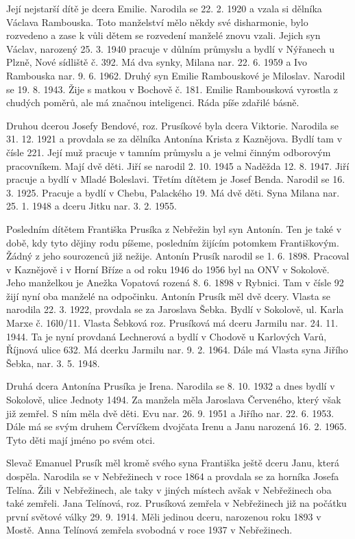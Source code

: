 \documentclass[../dejiny-rodu-prusiku.tex]{subfiles}
\begin{document}
Její nejstarší dítě je dcera Emilie. Narodila se 22.  2. 1920 a vzala si dělníka Václava Rambouska. Toto manžel­ství mělo někdy své disharmonie, bylo rozvedeno a za­se k vůli dětem se rozvedení manželé znovu vzali. Jejich syn Václav, narozený 25. 3. 1940 pracuje v důlním průmyslu a bydlí v Nýřanech u Plzně, Nové sídliště č. 392. Má dva synky, Milana nar. 22. 6. 1959 a Ivo Rambouska nar. 9. 6. 1962. Druhý syn Emilie Rambouskové je Miloslav. Narodil se 19. 8. 1943. Žije s matkou v Bochově č. 181. Emilie Rambousková vyrostla z chudých poměrů, ale má značnou inteligenci. Ráda píše zdařilé básně.

Druhou dcerou Josefy Bendové, roz. Prusíkové byla dcera Viktorie. Narodila se 31. 12. 1921 a provdala se za dělníka Antonína Krista z Kaznějova. Bydlí tam v čísle 221. Její muž pracuje v tamním průmyslu a je velmi činným odborovým pracovníkem. Mají dvě děti. Jiří se narodil 2. 10. 1945 a Naděžda 12. 8. 1947. Jiří pracuje a bydlí v Mladé Boleslavi. Třetím dítětem je Josef Benda. Narodil se 16. 3. 1925. Pracuje a bydlí v Chebu, Palackého 19. Má dvě děti. Syna Milana nar. 25. 1. 1948 a dceru Jitku nar. 3. 2. 1955.

Posledním dítětem Františka Prusíka z Nebřežin byl syn Antonín. Ten je také v době, kdy tyto dějiny rodu píšeme, posledním žijícím potomkem Františkovým. Žádný z jeho sourozenců již nežije. Antonín Prusík narodil se 1. 6. 1898. Pracoval v Kaznějově i v Horní Bříze a od roku 1946 do 1956 byl na ONV v Sokolově. Jeho manželkou je Anežka Vopatová rozená 8. 6. 1898 v Rybnici. Tam v čísle 92 žijí nyní oba manželé na odpočinku. Antonín Prusík měl dvě dcery. Vlasta se narodila 22. 3. 1922, provdala se za Jaroslava Šebka. Bydlí v Sokolově, ul. Karla Marxe č. 16l0/11. Vlasta Šebková roz. Prusíková má dceru Jarmilu nar. 24. 11. 1944. Ta je nyní provdaná Lechnerová a byd­lí v Chodově u Karlových Varů, Říjnová ulice 632. Má dcerku Jarmilu nar. 9. 2. 1964. Dále má Vlasta syna Jiřího Šebka, nar. 3. 5. 1948.

Druhá dcera Antonína Prusíka je Irena. Narodila se 8. 10. 1932 a dnes bydlí v Sokolově, ulice Jednoty 1494. Za manžela měla Jaroslava Červeného, který však již zemřel. S ním měla dvě děti. Evu nar. 26. 9. 1951 a Jiřího nar. 22. 6. 1953. Dále má se svým druhem Červíčkem dvojčata Irenu a Janu narozená 16. 2. 1965. Tyto děti mají jméno po svém otci.

Slevač Emanuel Prusík měl kromě svého syna Františka ještě dceru Janu, která dospěla. Narodila se v Nebřežinech v roce 1864 a provdala se za horníka Josefa Telína. Žili v Nebřežinech, ale taky v jiných místech avšak v Nebřežinech oba také zemřeli. Jana Telínová, roz. Prusíková zemřela v Nebřežinech již na počátku první světové války 29. 9. 1914. Měli jedinou dceru, narozenou roku 1893 v Mostě. Anna Telínová zemřela svobodná v roce 1937 v Nebřežinech.
\end{document}
